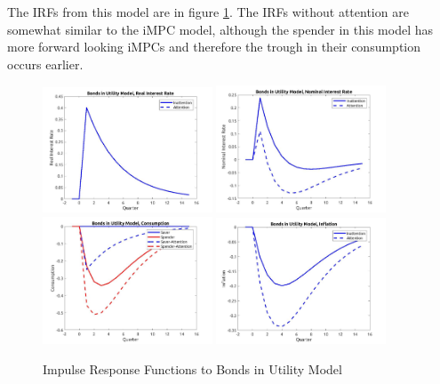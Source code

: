 \documentclass[AER]{AEA}
\begin{document}
The IRFs from this model are in figure \ref{fig:IRFBU}. The IRFs without attention are somewhat similar to the iMPC model, although the spender in this model has more forward looking iMPCs and therefore the trough in their consumption occurs earlier.

\begin{figure}
	\includegraphics[width=0.45\textwidth]{../Code/Dynare/Figures/RealRateBU.jpg}
	\includegraphics[width=0.45\textwidth]{../Code/Dynare/Figures/NominalRateBU.jpg}
	\includegraphics[width=0.45\textwidth]{../Code/Dynare/Figures/ConsumptionBU.jpg}
	\includegraphics[width=0.45\textwidth]{../Code/Dynare/Figures/InflationBU.jpg}
	\caption{Impulse Response Functions to Bonds in Utility Model}
	\label{fig:IRFBU}
\end{figure}





\appendix
\end{document}
